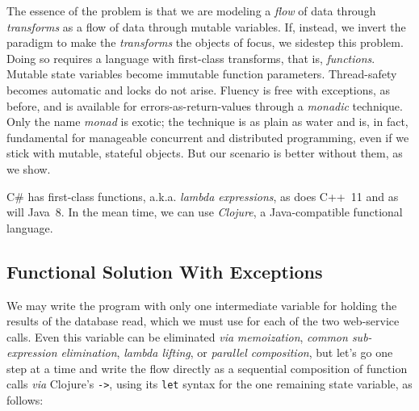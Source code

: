\documentclass[11pt]{article}
\begin{document}
The essence of the problem is that we are modeling a \emph{flow} of data
through \emph{transforms} as a flow of data through mutable variables.
If, instead, we invert the paradigm to make the \emph{transforms} the
objects of focus, we sidestep this problem. Doing so requires a
language with first-class transforms, that is, \emph{functions}. Mutable
state variables become immutable function parameters. Thread-safety
becomes automatic and locks do not arise. Fluency is free with
exceptions, as before, and is available for errors-as-return-values
through a \emph{monadic} technique. Only the name \emph{monad} is exotic; the
technique is as plain as water and is, in fact, fundamental for
manageable concurrent and distributed programming, even if we stick
with mutable, stateful objects. But our scenario is better without
them, as we show.

\mbox{C\#} has first-class functions, a.k.a. \emph{lambda expressions}, as
does \mbox{C++ 11} and as will \mbox{Java 8}. In the mean time, we
can use \emph{Clojure}, a Java-compatible functional language.

\subsection{Functional Solution With Exceptions}
\label{sec-3-1}

We may write the program with only one intermediate variable for
holding the results of the database read, which we must use for each
of the two web-service calls. Even this variable can be eliminated
\emph{via} \emph{memoization}, \emph{common sub-expression elimination}, \emph{lambda
lifting}, or \emph{parallel composition}, but let's go one step at a time
and write the flow directly as a sequential composition of function
calls \emph{via} Clojure's \verb|->|, using its \verb|let| syntax for the
one remaining state variable, as follows:
\end{document}
